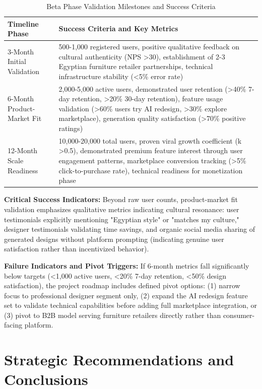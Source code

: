 \begin{table}[htbp]
\centering
\caption{Beta Phase Validation Milestones and Success Criteria}
\label{tab:milestones}
\begin{tabular}{lp{10cm}}
\toprule
\textbf{Timeline Phase} & \textbf{Success Criteria and Key Metrics} \\
\midrule
3-Month Initial Validation & 500-1,000 registered users, positive qualitative feedback on cultural authenticity (NPS >30), establishment of 2-3 Egyptian furniture retailer partnerships, technical infrastructure stability (<5\% error rate) \\
6-Month Product-Market Fit & 2,000-5,000 active users, demonstrated user retention (>40\% 7-day retention, >20\% 30-day retention), feature usage validation (>60\% users try AI redesign, >30\% explore marketplace), generation quality satisfaction (>70\% positive ratings) \\
12-Month Scale Readiness & 10,000-20,000 total users, proven viral growth coefficient (k >0.5), demonstrated premium feature interest through user engagement patterns, marketplace conversion tracking (>5\% click-to-purchase rate), technical readiness for monetization phase \\
\bottomrule
\end{tabular}
\end{table}

\textbf{Critical Success Indicators:} Beyond raw user counts, product-market fit validation emphasizes qualitative metrics indicating cultural resonance: user testimonials explicitly mentioning "Egyptian style" or "matches my culture," designer testimonials validating time savings, and organic social media sharing of generated designs without platform prompting (indicating genuine user satisfaction rather than incentivized behavior).

\textbf{Failure Indicators and Pivot Triggers:} If 6-month metrics fall significantly below targets (<1,000 active users, <20\% 7-day retention, <50\% design satisfaction), the project roadmap includes defined pivot options: (1) narrow focus to professional designer segment only, (2) expand the AI redesign feature set to validate technical capabilities before adding full marketplace integration, or (3) pivot to B2B model serving furniture retailers directly rather than consumer-facing platform.

\section{Strategic Recommendations and Conclusions}
\label{sec:app_conclusions}

